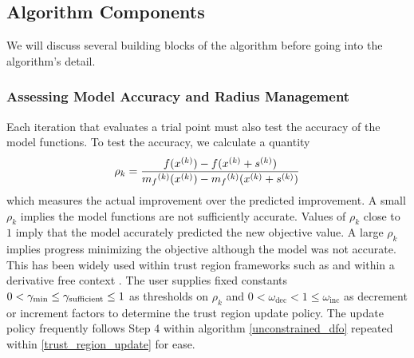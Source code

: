 

\subsection{Algorithm Components}




We will discuss several building blocks of the algorithm before going into the algorithm's detail.

\subsubsection{Assessing Model Accuracy and Radius Management}

Each iteration that evaluates a trial point must also test the accuracy of the model functions.
To test the accuracy, we calculate a quantity
\begin{equation}
\label{rho}
\rho_k = \frac{f({x}^{(k)}) - f({x}^{(k)}+{{s}^{(k)}})}{{{m}_f}^{(k)}({x}^{(k)}) - {{m}_f}^{(k)}({x}^{(k)}+{{s}^{(k)}})}
\end{equation}
which measures the actual improvement over the predicted improvement.
A small $\rho_k$ implies the model functions are not sufficiently accurate.
Values of $\rho_k$ close to $1$ imply that the model accurately predicted the new objective value.
A large $\rho_k$ implies progress minimizing the objective although the model was not accurate.
This has been widely used within trust region frameworks such as \cite{Conn:2000:TM:357813} and within a derivative free context \cite{DUMMY:intro_book}.
The user supplies fixed constants $0 < \gamma_{\text{min}} \le \gamma_{\text{sufficient}} \le 1$ as thresholds on $\rho_k$ and $0 < \omega_{\text{dec}} < 1 \le \omega_{\text{inc}}$ as decrement or increment factors to determine the trust region update policy.
The update policy frequently follows Step 4 within algorithm \cref{unconstrained_dfo} repeated within \cref{trust_region_update} for ease.

